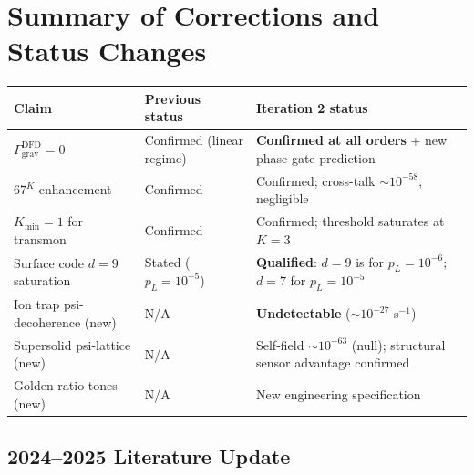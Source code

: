 \documentclass[11pt]{article}
\theoremstyle{definition}
\theoremstyle{remark}
\begin{document}
\section*{Summary of Corrections and Status Changes}

\begin{center}
\begin{tabular}{lll}
\toprule
Claim & Previous status & Iteration 2 status \\
\midrule
$\Gamma_{\mathrm{grav}}^{\mathrm{DFD}} = 0$ & Confirmed (linear regime) &
  \textbf{Confirmed at all orders} + new phase gate prediction \\
$67^K$ enhancement & Confirmed & Confirmed; cross-talk $\sim10^{-58}$, negligible \\
$K_{\min} = 1$ for transmon & Confirmed & Confirmed; threshold saturates at $K=3$ \\
Surface code $d=9$ saturation & Stated ($p_L = 10^{-5}$) &
  \textbf{Qualified}: $d=9$ is for $p_L = 10^{-6}$; $d=7$ for $p_L = 10^{-5}$ \\
Ion trap psi-decoherence (new) & N/A &
  \textbf{Undetectable} ($\sim10^{-27}$ s$^{-1}$) \\
Supersolid psi-lattice (new) & N/A &
  Self-field $\sim10^{-63}$ (null); structural sensor advantage confirmed \\
Golden ratio tones (new) & N/A & New engineering specification \\
\bottomrule
\end{tabular}
\end{center}

\subsection*{2024--2025 Literature Update}
\end{document}
